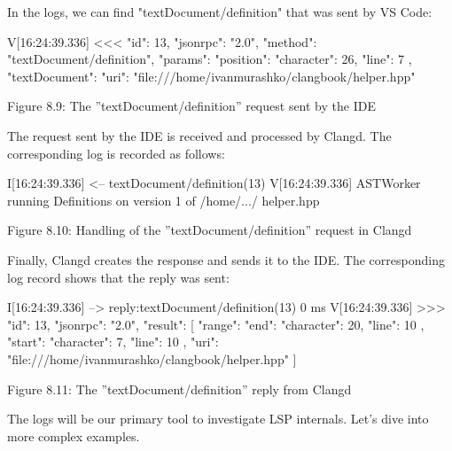 In the logs, we can find "textDocument/definition" that was sent by VS Code:

\begin{shell}
V[16:24:39.336] <<< {
    "id": 13,
    "jsonrpc": "2.0",
    "method": "textDocument/definition",
    "params": {
        "position": {
            "character": 26,
            "line": 7
        },
        "textDocument": {
            "uri": "file:///home/ivanmurashko/clangbook/helper.hpp"
        }
    }
}
\end{shell}


\begin{center}
Figure 8.9: The ”textDocument/definition” request sent by the IDE
\end{center}

The request sent by the IDE is received and processed by Clangd. The corresponding log is recorded as follows:

\begin{shell}
I[16:24:39.336] <-- textDocument/definition(13)
V[16:24:39.336] ASTWorker running Definitions on version 1 of /home/.../
helper.hpp
\end{shell}


\begin{center}
Figure 8.10: Handling of the ”textDocument/definition” request in Clangd
\end{center}

Finally, Clangd creates the response and sends it to the IDE. The corresponding log record shows that the reply was sent:

\begin{shell}
I[16:24:39.336] --> reply:textDocument/definition(13) 0 ms
V[16:24:39.336] >>> {
    "id": 13,
    "jsonrpc": "2.0",
    "result": [
    {
        "range": {
            "end": {
                "character": 20,
                "line": 10
            },
            "start": {
                "character": 7,
                "line": 10
            }
        },
        "uri": "file:///home/ivanmurashko/clangbook/helper.hpp"
    }
    ]
}
\end{shell}


\begin{center}
Figure 8.11: The ”textDocument/definition” reply from Clangd
\end{center}

The logs will be our primary tool to investigate LSP internals. Let’s dive into more complex examples.



